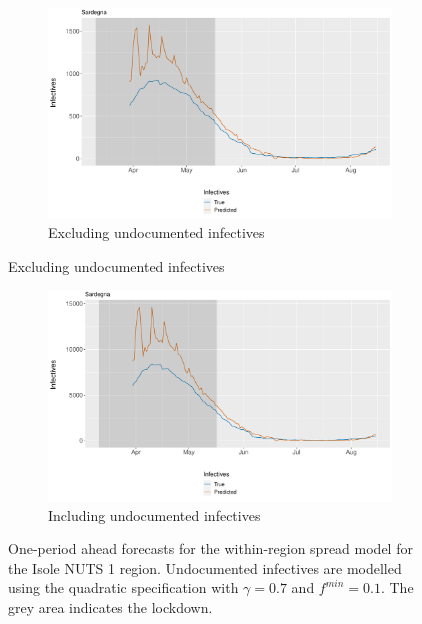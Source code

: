 \documentclass[12pt]{article}
\begin{document}
\begin{appendices}
		\begin{figure}[H]
    	    \centering
    	    \begin{subfigure}{\textwidth}
    	      \centering
    	      \includegraphics[width=0.94\linewidth]{output/model_within_lag14_forecast_start20_Isole_rolling.pdf}
    	      \caption{Excluding undocumented infectives}
    	      \label{fig:forecast_within_isole_regular}
    	    \end{subfigure}
        \end{figure}
        \begin{figure}[H]\ContinuedFloat
    	    \begin{subfigure}{\textwidth}
    	      \centering
    	      \includegraphics[width=0.94\linewidth]{output/model_within_lag14_forecast_start20_Isole_UndocQuadratic_rolling.pdf}
    	      \caption{Including undocumented infectives}
    	      \label{fig:forecast_within_isole_undoc}
    	    \end{subfigure}
    	    \caption{One-period ahead forecasts for the within-region spread model for the Isole NUTS 1 region. Undocumented infectives are modelled using the quadratic specification with $\gamma = 0.7$ and $f^{min}=0.1$. The grey area indicates the lockdown.}
    	    \label{fig:forecast_within_isole}
        \end{figure}
		

\end{appendices}
\end{document}

